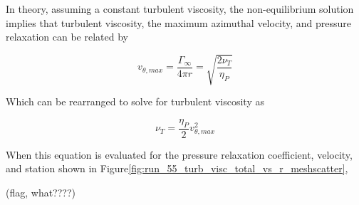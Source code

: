 

In theory, assuming a constant turbulent viscosity, the non-equilibrium 
solution  implies that turbulent viscosity, the maximum azimuthal velocity, and 
pressure relaxation can be related by

\begin{equation}
v_{\theta, max} = \frac{\Gamma_\infty}{4 \pi r} = \sqrt{\frac{2 \nu_T}{\eta_P}}
\end{equation}

Which can be rearranged to solve for turbulent viscosity as

\begin{equation}
\nu_T = \frac{\eta_P}{2} v_{\theta, max}^2 
\end{equation}

\noindent
When this equation is evaluated for the pressure relaxation coefficient, 
velocity, and station shown in 
Figure\ref{fig:run_55_turb_visc_total_vs_r_meshscatter},

(flag, what????)